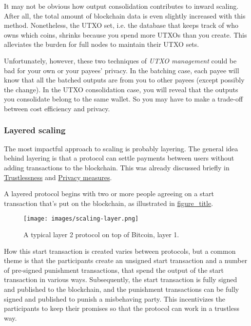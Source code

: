 It may not be obvious how output consolidation contributes to inward
scaling. After all, the total amount of blockchain data is even slightly
increased with this method. Nonetheless, the UTXO set, i.e. the database
that keeps track of who owns which coins, shrinks because you spend more
UTXOs than you create. This alleviates the burden for full nodes to
maintain their UTXO sets.

Unfortunately, however, these two techniques of \emph{UTXO management}
could be bad for your own or your payees' privacy. In the batching case,
each payee will know that all the batched outputs are from you to other
payees (except possibly the change). In the UTXO consolidation case, you
will reveal that the outputs you consolidate belong to the same wallet.
So you may have to make a trade-off between cost efficiency and privacy.

\hypertarget{layeredscaling}{%
\subsubsection{Layered scaling}\label{layeredscaling}}

The most impactful approach to scaling is probably layering. The general
idea behind layering is that a protocol can settle payments between
users without adding transactions to the blockchain. This was already
discussed briefly in \protect\hyperlink{trustlessness}{Trustlessness}
and \protect\hyperlink{privacymeasures}{Privacy measures}.

A layered protocol begins with two or more people agreeing on a start
transaction that's put on the blockchain, as illustrated in
\protect\hyperlink{fig-scaling-layer}{figure\_title}.

\begin{figure}
\hypertarget{fig-scaling-layer}{%
\centering
\texttt{[image: images/scaling-layer.png]}
\caption{A typical layer 2 protocol on top of Bitcoin, layer
1.}\label{fig-scaling-layer}
}
\end{figure}

How this start transaction is created varies between protocols, but a
common theme is that the participants create an unsigned start
transaction and a number of pre-signed punishment transactions, that
spend the output of the start transaction in various ways. Subsequently,
the start transaction is fully signed and published to the blockchain,
and the punishment transactions can be fully signed and published to
punish a misbehaving party. This incentivizes the participants to keep
their promises so that the protocol can work in a trustless way.

